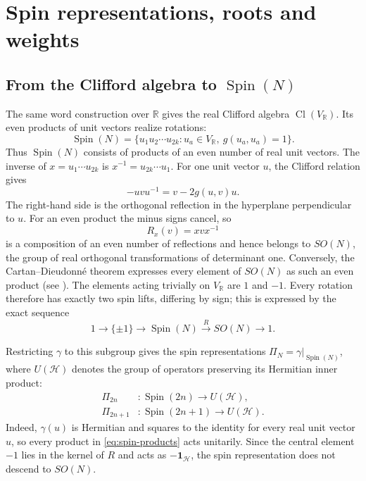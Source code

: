 \documentclass{article}
\theoremstyle{definition}
\theoremstyle{remark}
\newcommand{\R}{\mathbb R}
\newcommand{\Cl}{\operatorname{Cl}}
\newcommand{\Spin}{\operatorname{Spin}}
\begin{document}
\section{Spin representations, roots and weights}
\label{sec:spin-representations}

\subsection{From the Clifford algebra to
\texorpdfstring{$\Spin(N)$}{Spin(N)}}
\label{sec:spin-cover}

The same word construction over $\R$ gives the real Clifford algebra
$\Cl(V_{\mathbb R})$. Its even products of unit vectors realize rotations:
\begin{equation}
 \Spin(N)=
 \{u_1u_2\cdots u_{2k}:
   u_a\in V_{\mathbb R},\ g(u_a,u_a)=1\}.
 \label{eq:spin-products}
\end{equation}
Thus $\Spin(N)$ consists of products of an even number of real unit
vectors.  The inverse of
$x=u_1\cdots u_{2k}$ is $x^{-1}=u_{2k}\cdots u_1$.
For one unit vector $u$, the Clifford relation gives
\begin{equation}
 -uvu^{-1}=v-2g(u,v)u.
\end{equation}
The right-hand side is the orthogonal reflection in the hyperplane
perpendicular to $u$.  For an even product the minus signs cancel, so
\begin{equation}
 R_x(v)=xvx^{-1}
\end{equation}
is a composition of an even number of reflections and hence belongs to
$SO(N)$, the group of real orthogonal transformations of determinant one.
Conversely, the Cartan--Dieudonn\'e theorem expresses every
element of $SO(N)$ as such an even product (see
\cite[Chapter~I]{Chevalley1954}). The elements acting trivially
on $V_{\mathbb R}$ are $1$ and $-1$. Every rotation therefore has exactly
two spin lifts, differing by sign; this is expressed by the exact sequence
\begin{equation}
 1\longrightarrow\{\pm1\}\longrightarrow
 \Spin(N)\xrightarrow{\,R\,}SO(N)\longrightarrow1.
 \label{eq:spin-double-cover}
\end{equation}

Restricting $\gamma$ to this subgroup gives the spin representations
$\Pi_N=\gamma|_{\Spin(N)}$, where $U(\mathcal H)$ denotes the group of
operators preserving its Hermitian inner product:
\begin{align}
 \Pi_{2n}&:\Spin(2n)\longrightarrow U(\mathcal H),
 \\
 \Pi_{2n+1}&:\Spin(2n+1)\longrightarrow U(\mathcal H).
\end{align}
Indeed, $\gamma(u)$ is Hermitian and squares to the identity for every real
unit vector $u$, so every product in \eqref{eq:spin-products} acts
unitarily.  Since the central element $-1$ lies in the kernel of $R$ and acts
as $-\mathbf1_{\mathcal H}$, the spin representation does not descend
to $SO(N)$.
\end{document}
